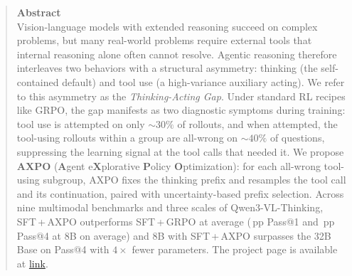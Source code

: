 \begin{abstract}
\textbf{Abstract}\\
Vision-language models with extended reasoning succeed on complex problems, but many real-world problems require external tools that internal reasoning alone often cannot resolve. Agentic reasoning therefore interleaves two behaviors with a structural asymmetry: thinking (the self-contained default) and tool use (a high-variance auxiliary acting). We refer to this asymmetry as the \emph{Thinking-Acting Gap}. Under standard RL recipes like GRPO, the gap manifests as two diagnostic symptoms during training: tool use is attempted on only $\sim$$30\%$ of rollouts, and when attempted, the tool-using rollouts within a group are all-wrong on $\sim$$40\%$ of questions, suppressing the learning signal at the tool calls that needed it. We propose \textbf{AXPO} (\textbf{A}gent e\textbf{X}plorative \textbf{P}olicy \textbf{O}ptimization): for each all-wrong tool-using subgroup, AXPO fixes the thinking prefix and resamples the tool call and its continuation, paired with uncertainty-based prefix selection.
Across nine multimodal benchmarks and three scales of Qwen3-VL-Thinking, SFT\,+\,AXPO outperforms SFT\,+\,GRPO at average (\dPassOneEightB\,pp Pass@1 and \dPassFourEightB\,pp Pass@4 at 8B on average) and 8B with SFT\,+\,AXPO surpasses the 32B Base on Pass@4 with $4\times$ fewer parameters.
The project page is available at \href{https://byungkwanlee.github.io/AXPO-page/}{link}.
\end{abstract}